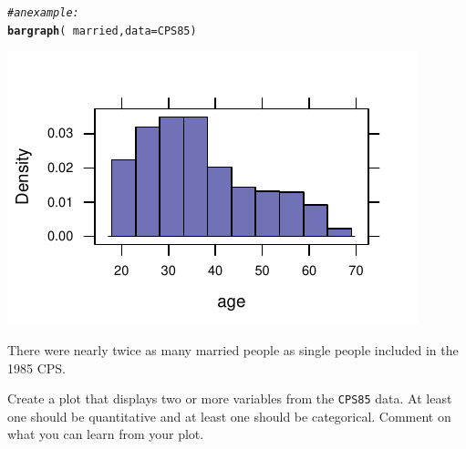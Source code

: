 \documentclass[twoside]{book}\usepackage[]{graphicx}\usepackage[]{xcolor}
\makeatletter
\def\maxwidth{ %
  \ifdim\Gin@nat@width>\linewidth
    \linewidth
  \else
    \Gin@nat@width
  \fi
}
\newcommand{\hlcom}[1]{\textcolor[rgb]{0.678,0.584,0.686}{\textit{#1}}}%
\newcommand{\hlopt}[1]{\textcolor[rgb]{0,0,0}{#1}}%
\newcommand{\hlstd}[1]{\textcolor[rgb]{0.345,0.345,0.345}{#1}}%
\newcommand{\hlkwc}[1]{\textcolor[rgb]{0.333,0.667,0.333}{#1}}%
\newcommand{\hlkwd}[1]{\textcolor[rgb]{0.737,0.353,0.396}{\textbf{#1}}}%
\newenvironment{kframe}{%
 \def\at@end@of@kframe{}%
 \ifinner\ifhmode%
  \def\at@end@of@kframe{\end{minipage}}%
  \begin{minipage}{\columnwidth}%
 \fi\fi%
 \def\FrameCommand##1{\hskip\@totalleftmargin \hskip-\fboxsep
 \colorbox{shadecolor}{##1}\hskip-\fboxsep
     \hskip-\linewidth \hskip-\@totalleftmargin \hskip\columnwidth}%
 \MakeFramed {\advance\hsize-\width
   \@totalleftmargin\z@ \linewidth\hsize
   \@setminipage}}%
 {\par\unskip\endMakeFramed%
 \at@end@of@kframe}
\newenvironment{knitrout}{}{} %
\newcommand{\Rindex}[1]{\index{\texttt{#1}}}
\newcommand{\dataframe}[1]{{\color{blue!80!black}\texttt{#1}}\Rindex{#1}}
\newcounter{example}[section]
\makeatother
\begin{document}
\begin{solution}
\begin{knitrout}
\color{fgcolor}\begin{kframe}
\begin{alltt}
\hlcom{#an example:}
\hlkwd{bargraph}\hlstd{(} \hlopt{~} \hlstd{married ,} \hlkwc{data}\hlstd{=CPS85)}
\end{alltt}
\end{kframe}

{\centering \includegraphics[width=\maxwidth]{figures/fig-unnamed-chunk-22-1} 

}



\end{knitrout}
There were nearly twice as many married people as single people included in the 1985 CPS. 
\end{solution}


\begin{problem}
	Create a plot that displays two or more variables from the 
	\dataframe{CPS85} data.  At least one should be quantitative 
	and at least one should be categorical.
	Comment on what you can learn from your plot.
\end{problem}
\end{document}
